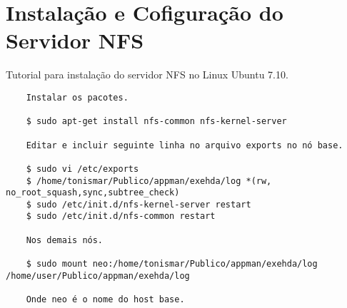 \chapter{Instalação e Cofiguração do Servidor NFS}
\label{anexo:nfs}

Tutorial para instalação do servidor NFS no Linux Ubuntu 7.10.

\begin{scriptsize}
\begin{verbatim}
	Instalar os pacotes.
	
	$ sudo apt-get install nfs-common nfs-kernel-server
	
	Editar e incluir seguinte linha no arquivo exports no nó base.
	
	$ sudo vi /etc/exports
	$ /home/tonismar/Publico/appman/exehda/log *(rw, no_root_squash,sync,subtree_check)
	$ sudo /etc/init.d/nfs-kernel-server restart
	$ sudo /etc/init.d/nfs-common restart
	
	Nos demais nós.
	
	$ sudo mount neo:/home/tonismar/Publico/appman/exehda/log /home/user/Publico/appman/exehda/log
	
	Onde neo é o nome do host base.
\end{verbatim}
\end{scriptsize}